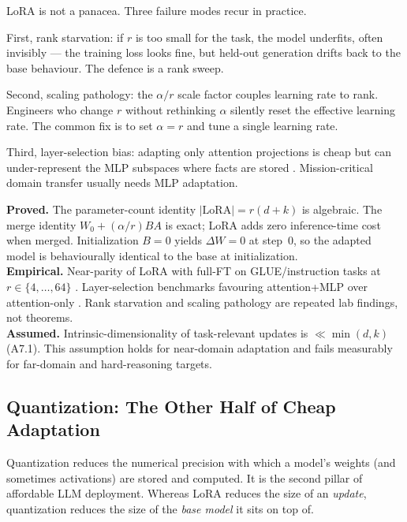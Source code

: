 LoRA is not a panacea. Three failure modes recur in practice.

First, rank starvation: if $r$ is too small for the task, the model
underfits, often invisibly --- the training loss looks fine, but
held-out generation drifts back to the base behaviour. The
defence is a rank sweep.

Second, scaling pathology: the $\alpha/r$ scale factor couples
learning rate to rank. Engineers who change $r$ without rethinking
$\alpha$ silently reset the effective learning rate. The common fix
is to set $\alpha = r$ and tune a single learning rate.

Third, layer-selection bias: adapting only attention projections is
cheap but can under-represent the MLP subspaces where facts are
stored \citep{geva2021keyvalue}. Mission-critical domain transfer
usually needs MLP adaptation.

\begin{provedassumed}
\textbf{Proved.} The parameter-count identity
$|\text{LoRA}| = r(d+k)$ is algebraic. The merge identity
$W_0 + (\alpha/r)BA$ is exact; LoRA adds zero inference-time cost
when merged. Initialization $B=0$ yields $\Delta W = 0$ at step~0,
so the adapted model is behaviourally identical to the base at
initialization.\\
\textbf{Empirical.} Near-parity of LoRA with full-FT on
GLUE/instruction tasks at $r \in \{4,\dots,64\}$
\citep{hu2021lora}. Layer-selection benchmarks favouring
attention+MLP over attention-only \citep{hu2021lora,
raschka2023finetuning}. Rank starvation and scaling pathology are
repeated lab findings, not theorems.\\
\textbf{Assumed.} Intrinsic-dimensionality of task-relevant updates
is $\ll \min(d,k)$ (A7.1). This assumption holds for near-domain
adaptation and fails measurably for far-domain and
hard-reasoning targets.
\end{provedassumed}

\subsection{Quantization: The Other Half of Cheap Adaptation}

Quantization reduces the numerical precision with which a model's
weights (and sometimes activations) are stored and computed. It is
the second pillar of affordable LLM deployment. Whereas LoRA reduces
the size of an \emph{update}, quantization reduces the size of the
\emph{base model} it sits on top of.

